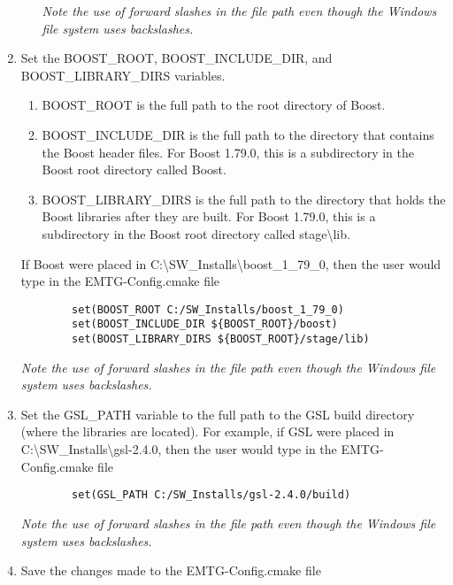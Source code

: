 \begin{enumerate}
\begin{enumerate}
		\emph{Note the use of forward slashes in the file path even though the Windows file system uses backslashes.}
	\end{enumerate}
	\item Set the BOOST\_ROOT, BOOST\_INCLUDE\_DIR, and BOOST\_LIBRARY\_DIRS variables.
	\begin{enumerate}
		\item BOOST\_ROOT is the full path to the root directory of Boost.
		\item BOOST\_INCLUDE\_DIR is the full path to the directory that contains the Boost header files. For Boost 1.79.0, this is a subdirectory in the Boost root directory called Boost.
		\item BOOST\_LIBRARY\_DIRS is the full path to the directory that holds the Boost libraries after they are built. For Boost 1.79.0, this is a subdirectory in the Boost root directory called stage\textbackslash lib.
	\end{enumerate}
	If Boost were placed in C:\textbackslash SW\_Installs\textbackslash boost\_1\_79\_0, then the user would type in the EMTG-Config.cmake file 
	\begin{verbatim}
		set(BOOST_ROOT C:/SW_Installs/boost_1_79_0) 
		set(BOOST_INCLUDE_DIR ${BOOST_ROOT}/boost) 
		set(BOOST_LIBRARY_DIRS ${BOOST_ROOT}/stage/lib) 
	\end{verbatim}	
	\emph{Note the use of forward slashes in the file path even though the Windows file system uses backslashes.}
	\item Set the GSL\_PATH variable to the full path to the GSL build directory (where the libraries are located). For example, if GSL were placed in C:\textbackslash SW\_Installs\textbackslash gsl-2.4.0, then the user would type in the EMTG-Config.cmake file 
	\begin{verbatim}
		set(GSL_PATH C:/SW_Installs/gsl-2.4.0/build)
	\end{verbatim}
	\emph{Note the use of forward slashes in the file path even though the Windows file system uses backslashes.}
	\item Save the changes made to the EMTG-Config.cmake file
\end{enumerate}